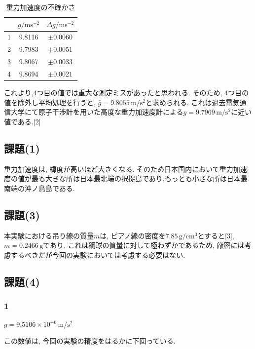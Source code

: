 \documentclass{jarticle}
\begin{document}
\begin{table}[H]
  \centering
  \caption{重力加速度の不確かさ}
  \begin{tabular}{ccc}
    \hline
    & $g/\mathrm{ms^{-2}}$ & $\Delta g/\mathrm{ms^{-2}}$ \\
    \hline
    1 & 9.8116 & $\pm 0.0060$ \\
    2 & 9.7983 & $\pm 0.0051$ \\
    3 & 9.8067 & $\pm 0.0033$ \\
    4 & 9.8694 & $\pm 0.0021$ \\
    \hline
  \end{tabular}
\end{table}

これより,4つ目の値では重大な測定ミスがあったと思われる. そのため, 4つ目の値を除外し平均処理を行うと, $\bar{g}=9.8055\,\mathrm{m/s^2}$と求められる. これは過去電気通信大学にて原子干渉計を用いた高度な重力加速度計による$g=9.7969\,\mathrm{m/s^2}$に近い値である.[2]


\subsection{課題(1)}

重力加速度は, 緯度が高いほど大きくなる.
そのため日本国内において重力加速度の値が最も大きな所は日本最北端の択捉島であり,もっとも小さな所は日本最南端の沖ノ鳥島である.


\subsection{課題(3)}

本実験における吊り線の質量$m$は, ピアノ線の密度を$7.85\,\mathrm{g/cm^3}$とすると[3], $m=0.2466\,\mathrm{g}$であり, これは鋼球の質量に対して極わずかであるため, 厳密には考慮するべきだが今回の実験においては考慮する必要はない.


\subsection{課題(4)}


\subsubsection{\textcircled{\scriptsize 1}}

$g=9.5106\times10^{-6}\,\mathrm{m/s^2}$

この数値は, 今回の実験の精度をはるかに下回っている.
\end{document}
